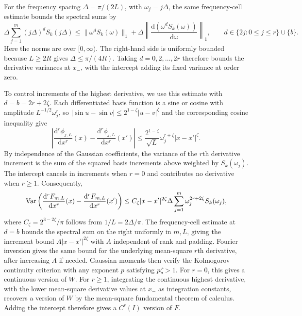 \begin{proofEnd}
For the frequency spacing $\Delta=\pi/(2L)$, with $\omega_j=j\Delta$,
the same frequency-cell estimate bounds the spectral sums by
\[
 \Delta\sum_{j=1}^m(j\Delta)^dS_k(j\Delta)
 \leq\|\omega^dS_k(\omega)\|_1+
 \Delta\left\|\frac{\mathrm{d}(\omega^dS_k(\omega))}{\mathrm{d}\omega}\right\|_1,
 \qquad d\in\{2j:0\leq j\leq r\}\cup\{b\}.
\]
Here the norms are over $[0,\infty)$. The right-hand side is uniformly
bounded because $L\geq2R$ gives $\Delta\leq\pi/(4R)$.
Taking $d=0,2,\ldots,2r$ therefore bounds the derivative variances at
$x_-$, with the intercept adding its fixed variance at order zero.

To control increments of the highest derivative, we use this estimate
with $d=b=2r+2\zeta$. Each differentiated basis function is a sine or
cosine with amplitude $L^{-1/2}\omega_j^r$, so
$|\sin u-\sin v|\leq2^{1-\zeta}|u-v|^\zeta$ and the corresponding
cosine inequality give
\[
 \left|\frac{\mathrm{d}^r\phi_{j,L}}{\mathrm{d}x^r}(x)-
        \frac{\mathrm{d}^r\phi_{j,L}}{\mathrm{d}x^r}(x')\right|
 \leq\frac{2^{1-\zeta}}{\sqrt L}
       \omega_j^{r+\zeta}|x-x'|^\zeta.
\]
By independence of the Gaussian coefficients, the variance of the
$r$th derivative increment is the sum of the squared basis increments
above weighted by $S_k(\omega_j)$. The intercept cancels in increments when $r=0$ and
contributes no derivative when $r\geq1$. Consequently,
\[
 \operatorname{Var}\left(\frac{\mathrm{d}^rF_{m,L}}{\mathrm{d}x^r}(x)-
           \frac{\mathrm{d}^rF_{m,L}}{\mathrm{d}x^r}(x')\right)
 \leq C_\zeta|x-x'|^{2\zeta}
       \Delta\sum_{j=1}^m\omega_j^{2r+2\zeta}S_k(\omega_j),
\]
where $C_\zeta=2^{3-2\zeta}/\pi$ follows from $1/L=2\Delta/\pi$.
The frequency-cell estimate at $d=b$ bounds the spectral sum on the
right uniformly in $m,L$, giving the increment bound
$A|x-x'|^{2\zeta}$ with $A$ independent of rank and padding.
Fourier inversion gives the same bound for the underlying mean-square
$r$th derivative, after increasing $A$ if needed. Gaussian moments
then verify the Kolmogorov continuity criterion
\citep{kallenberg2021foundations} with any exponent $p$ satisfying
$p\zeta>1$.
For $r=0$, this gives a continuous version of $W$. For $r\geq1$,
integrating the continuous highest derivative, with the lower
mean-square derivative values at $x_-$ as integration constants,
recovers a version of $W$ by the mean-square fundamental theorem of
calculus. Adding the intercept therefore gives a $C^r(I)$ version of $F$.


\end{proofEnd}
